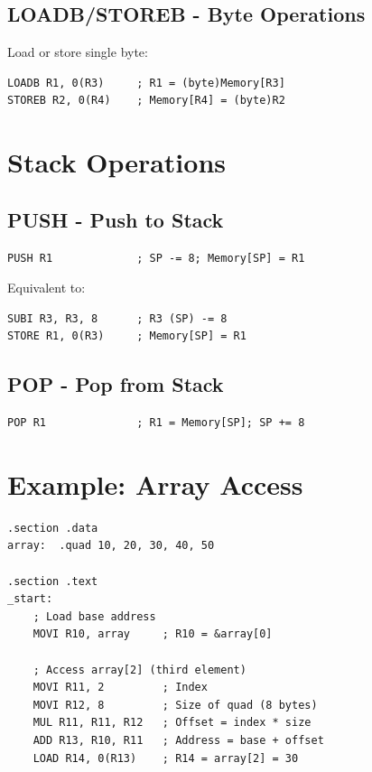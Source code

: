 \documentclass[12pt,a4paper,oneside]{book}
\begin{document}
\subsection{LOADB/STOREB - Byte Operations}

Load or store single byte:

\begin{lstlisting}[style=assembly]
LOADB R1, 0(R3)     ; R1 = (byte)Memory[R3]
STOREB R2, 0(R4)    ; Memory[R4] = (byte)R2
\end{lstlisting}

\section{Stack Operations}

\subsection{PUSH - Push to Stack}

\begin{lstlisting}[style=assembly]
PUSH R1             ; SP -= 8; Memory[SP] = R1
\end{lstlisting}

Equivalent to:
\begin{lstlisting}[style=assembly]
SUBI R3, R3, 8      ; R3 (SP) -= 8
STORE R1, 0(R3)     ; Memory[SP] = R1
\end{lstlisting}

\subsection{POP - Pop from Stack}

\begin{lstlisting}[style=assembly]
POP R1              ; R1 = Memory[SP]; SP += 8
\end{lstlisting}

\section{Example: Array Access}

\begin{lstlisting}[style=assembly, caption={Array Access Example}]
.section .data
array:  .quad 10, 20, 30, 40, 50

.section .text
_start:
    ; Load base address
    MOVI R10, array     ; R10 = &array[0]
    
    ; Access array[2] (third element)
    MOVI R11, 2         ; Index
    MOVI R12, 8         ; Size of quad (8 bytes)
    MUL R11, R11, R12   ; Offset = index * size
    ADD R13, R10, R11   ; Address = base + offset
    LOAD R14, 0(R13)    ; R14 = array[2] = 30
\end{lstlisting}
\end{document}
